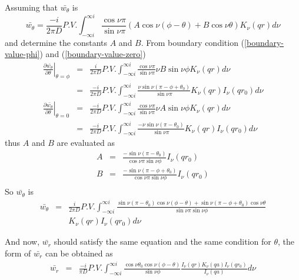 \documentclass{article}
\begin{document}
Assuming that $\bar{w_\theta}$ is
\begin{equation}
    \bar{w_\theta}
  = \frac{-i}{2\pi D}P.V.\int^{\infty i}_{-\infty i}
    \frac{\cos\nu\pi}{\sin\nu\pi}
    (A\cos\nu(\phi - \theta) + B\cos\nu\theta)
    K_\nu(qr)d\nu
\end{equation}
and determine the constants $A$ and $B$. From boundary condition
(\ref{boundary-value-phi}) and (\ref{boundary-value-zero})
\begin{eqnarray}
%
%
    \left.\frac{\partial\bar{w_\theta}}{\partial\theta}\right|_{\theta = \phi}
    &=& \frac{i}{2\pi D}P.V.\int^{\infty i}_{-\infty i}
    \frac{\cos\nu\pi}{\sin\nu\pi}
    \nu B\sin\nu\phi
    K_\nu(qr)d\nu \nonumber \\
    &=& \frac{-i}{2\pi D}P.V.\int^{\infty i}_{-\infty i}
        \frac{\nu\sin\nu(\pi - \phi + \theta_0)}{\sin\nu\pi}
        K_\nu(qr)I_\nu(qr_0)d\nu \nonumber \\
%
%
    \left.\frac{\partial\bar{w_\theta}}{\partial\theta}\right|_{\theta = 0}
    &=& \frac{-i}{2\pi D}P.V.\int^{\infty i}_{-\infty i}
    \frac{\cos\nu\pi}{\sin\nu\pi}
    \nu A\sin\nu\phi
    K_\nu(qr)d\nu \nonumber \\
    &=& \frac{-i}{2\pi D}P.V.\int^{\infty i}_{-\infty i}
        \frac{-\nu\sin\nu(\pi - \theta_0)}{\sin\nu\pi}
        K_\nu(qr)I_\nu(qr_0)d\nu
\end{eqnarray}
thus $A$ and $B$ are evaluated as
\begin{eqnarray}
    A &=& \frac{-\sin\nu(\pi - \theta_0)}{\cos\nu\pi\sin\nu\phi}I_\nu(qr_0)
    \nonumber \\
    B &=& \frac{-\sin\nu(\pi-\phi+\theta_0)}{\cos\nu\pi\sin\nu\phi}I_\nu(qr_0)
    \nonumber \\
\end{eqnarray}
So $\bar{w_\theta}$ is
\begin{eqnarray}
    \bar{w_\theta} &=& \frac{i}{2\pi D}P.V.\int^{\infty i}_{-\infty i}
                \frac{\sin\nu(\pi - \theta_0)\cos\nu(\phi - \theta) +
                      \sin\nu(\pi-\phi+\theta_0)\cos\nu\theta}
                {\sin\nu\pi\sin\nu\phi}\nonumber \\
            & & K_\nu(qr)I_\nu(qr_0)d\nu\label{bar-w-theta}
\end{eqnarray}

And now, $\bar{w_r}$ should satisfy the same equation and the same condition for 
$\theta$, the form of $\bar{w_r}$ can be obtained as 
\begin{eqnarray}
    \bar{w_r} &=& \frac{-i}{\pi D}P.V.\int^{\infty i}_{-\infty i}
                  \frac{\cos\nu\theta_0\cos\nu(\phi - \theta)}{\sin\nu\phi}
                  \frac{I_\nu(qr)K_\nu(qa)I_\nu(qr_0)}{I_\nu(qa)}d\nu
    \label{bar-w-r}
\end{eqnarray}
\end{document}
